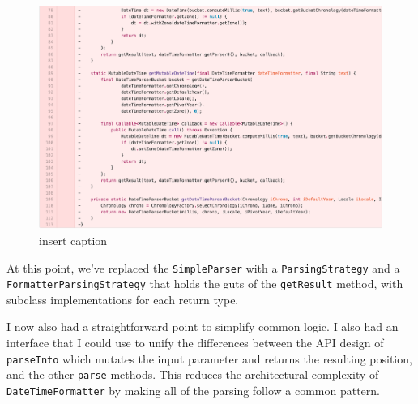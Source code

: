 \begin{figure}[H]
	\centering
	\includegraphics[width=\linewidth]{code110}
	\caption{insert caption}
\end{figure}

At this point, we’ve replaced the \texttt{SimpleParser} with a \texttt{ParsingStrategy} and a \texttt{FormatterParsingStrategy} that holds the guts of the \texttt{getResult} method, with subclass implementations for each return type. 

I now also had a straightforward point to simplify common logic. I also had an interface that I could use to unify the differences between the API design of \texttt{parseInto} which mutates the input parameter and returns the resulting position, and the other \texttt{parse} methods. This reduces the architectural complexity of \texttt{DateTimeFormatter} by making all of the parsing follow a common pattern.

